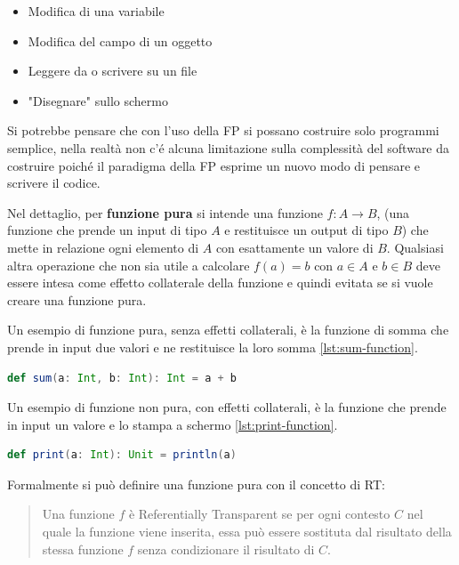 \documentclass[12pt,a4paper,openright,twoside]{book}
\begin{document}
\begin{itemize}
    \item Modifica di una variabile
    \item Modifica del campo di un oggetto
    \item Leggere da o scrivere su un file
    \item "Disegnare" sullo schermo
\end{itemize}

Si potrebbe pensare che con l'uso della \ac{FP} si possano costruire solo programmi semplice, nella realtà non c'é alcuna limitazione sulla complessità del software da costruire poiché il paradigma della FP esprime un nuovo modo di pensare e scrivere il codice.

Nel dettaglio, per \textbf{funzione pura} si intende una funzione $f:A\to B$, (una funzione che prende un input di tipo $A$ e restituisce un output di tipo $B$) che mette in relazione ogni elemento di $A$ con esattamente un valore di $B$. Qualsiasi altra operazione che non sia utile a calcolare $f(a)=b$ con $a\in A$ e $b\in B$ deve essere intesa come effetto collaterale della funzione e quindi evitata se si vuole creare una funzione pura.

Un esempio di funzione pura, senza effetti collaterali, è la funzione di somma che prende in input due valori e ne restituisce la loro somma \cref{lst:sum-function}. 

\begin{lstlisting}[language=Scala, label={lst:sum-function}, caption={Esempio di funzione pura in Scala}]
    def sum(a: Int, b: Int): Int = a + b
\end{lstlisting}

Un esempio di funzione non pura, con effetti collaterali, è la funzione che prende in input un valore e lo stampa a schermo \cref{lst:print-function}.

\begin{lstlisting}[language=Scala, label={lst:print-function}, caption={Esempio di funzione non pura in Scala}]
    def print(a: Int): Unit = println(a)
\end{lstlisting}

Formalmente si può definire una funzione pura con il concetto di \ac{RT}:

\begin{quote}
    Una funzione $f$ è Referentially Transparent se per ogni contesto $C$ nel quale la funzione viene inserita, essa può essere sostituta dal risultato della stessa funzione $f$ senza condizionare il risultato di $C$.
\end{quote}
\end{document}
